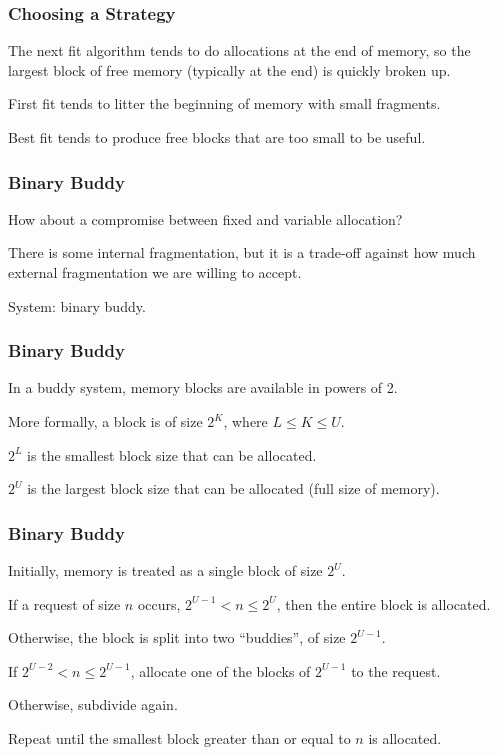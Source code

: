 \begin{frame}
\frametitle{Choosing a Strategy}

The next fit algorithm tends to do allocations at the end of memory, so the largest block of free memory (typically at the end) is quickly broken up. 

First fit tends to litter the beginning of memory with small fragments.

Best fit tends to produce free blocks that are too small to be useful. 


\end{frame}



\begin{frame}
\frametitle{Binary Buddy}
How about a compromise between fixed and variable allocation?

There is some internal fragmentation, but it is a trade-off against how much external fragmentation we are willing to accept.

System: \alert{binary buddy}.


\end{frame}



\begin{frame}
\frametitle{Binary Buddy}

In a buddy system, memory blocks are available in powers of 2. 

More formally, a block is of size $2^{K}$, where $L \leq K \leq U$.

$2^{L}$ is the smallest block size that can be allocated.

$2^{U}$ is the largest block size that can be allocated (full size of memory). 

\end{frame}



\begin{frame}
\frametitle{Binary Buddy}

Initially, memory is treated as a single block of size $2^{U}$. 

If a request of size $n$ occurs, $2^{U-1} < n \leq 2^{U}$, then the entire block is allocated. 

Otherwise, the block is split into two ``buddies'', of size $2^{U-1}$. 

If $2^{U-2} < n \leq 2^{U-1}$, allocate one of the blocks of $2^{U-1}$ to the request.

Otherwise, subdivide again. 
 
Repeat until the smallest block greater than or equal to $n$ is allocated. 

\end{frame}

